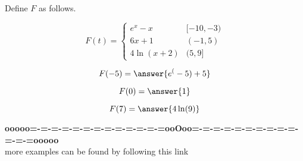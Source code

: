 \documentclass{ximera}
\begin{document}
\begin{example}

Define $F$ as follows.


\[
F(t) = 
\begin{cases}
  e^x - x   &    [-10, -3)     \\
  6x + 1  &    (-1, 5) \\
  4 \ln(x+2)    &    (5, 9]
\end{cases}
\]




\begin{question}

\[
F(-5) = \answer{e^(-5) + 5}
\]


\end{question}




\begin{question}

\[
F(0) = \answer{1}
\]


\end{question}






\begin{question}

\[
F(7) = \answer{4 \ln(9)}
\]


\end{question}




\end{example}


















\begin{center}
\textbf{\textcolor{green!50!black}{ooooo=-=-=-=-=-=-=-=-=-=-=-=-=ooOoo=-=-=-=-=-=-=-=-=-=-=-=-=ooooo}} \\

more examples can be found by following this link\\ 

\end{center}
\end{document}
